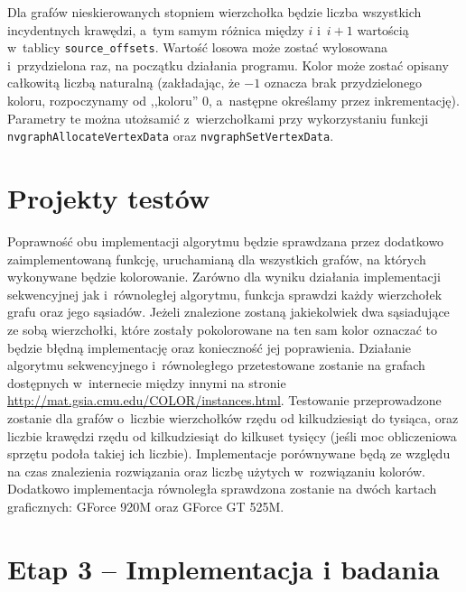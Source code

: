 \documentclass{article}
\begin{document}
	Dla grafów nieskierowanych stopniem wierzchołka będzie liczba wszystkich incydentnych krawędzi, a~tym samym różnica między $i$ i~$i+1$ wartością w~tablicy \texttt{source\_offsets}. Wartość losowa może zostać wylosowana i~przydzielona raz, na początku działania programu. Kolor może zostać opisany całkowitą liczbą naturalną (zakładając, że $-1$ oznacza brak przydzielonego koloru, rozpoczynamy od ,,koloru'' 0, a~następne określamy przez inkrementację). Parametry te można utożsamić z~wierzchołkami przy wykorzystaniu funkcji \texttt{nvgraphAllocateVertexData} oraz \texttt{nvgraphSetVertexData}.
	
	\section{Projekty testów}
	Poprawność obu implementacji algorytmu będzie sprawdzana przez dodatkowo zaimplementowaną funkcję, uruchamianą dla wszystkich grafów, na których wykonywane będzie kolorowanie. Zarówno dla wyniku działania implementacji sekwencyjnej jak i~równoległej algorytmu, funkcja sprawdzi każdy wierzchołek grafu oraz jego sąsiadów. Jeżeli znalezione zostaną jakiekolwiek dwa sąsiadujące ze sobą wierzchołki, które zostały pokolorowane na ten sam kolor oznaczać to będzie błędną implementację oraz konieczność jej poprawienia. Działanie algorytmu sekwencyjnego i~równoległego przetestowane zostanie na grafach dostępnych w~internecie między innymi na stronie \url{http://mat.gsia.cmu.edu/COLOR/instances.html}. Testowanie przeprowadzone zostanie dla grafów o~liczbie wierzchołków rzędu od kilkudziesiąt do tysiąca, oraz liczbie krawędzi rzędu od kilkudziesiąt do kilkuset tysięcy (jeśli moc obliczeniowa sprzętu podoła takiej ich liczbie). Implementacje porównywane będą ze względu na czas znalezienia rozwiązania oraz liczbę użytych w~rozwiązaniu kolorów. Dodatkowo implementacja równoległa sprawdzona zostanie na dwóch kartach graficznych: GForce 920M oraz GForce GT 525M.
	
	\section{Etap 3 -- Implementacja i badania}
\end{document}
